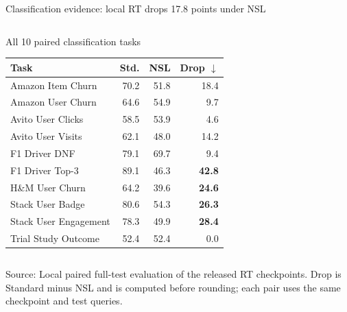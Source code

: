 \documentclass[aspectratio=169,10pt,t]{beamer}
\newcommand{\source}[1]{\vfill\par{\fontsize{6.3}{7.2}\selectfont\color{Muted}Source: #1}}
\newcommand{\bad}[1]{{\bfseries\color{Red}#1}}
\begin{document}
\begin{frame}{Classification evidence: local RT drops 17.8 points under NSL}
\begin{columns}[T,onlytextwidth]
      \vspace{0pt}
      \begin{block}{All 10 paired classification tasks}
        \fontsize{6.7}{7.7}\selectfont
        \renewcommand{\arraystretch}{1.08}
        \setlength{\tabcolsep}{2.7pt}
        \begin{tabularx}{\linewidth}{Xrrr}
          \toprule
          Task & Std. & NSL & Drop $\downarrow$ \\
          \midrule
          Amazon Item Churn & 70.2 & 51.8 & {\color{Red}18.4} \\
          Amazon User Churn & 64.6 & 54.9 & {\color{Red}9.7} \\
          Avito User Clicks & 58.5 & 53.9 & {\color{Red}4.6} \\
          Avito User Visits & 62.1 & 48.0 & {\color{Red}14.2} \\
          F1 Driver DNF & 79.1 & 69.7 & {\color{Red}9.4} \\
          F1 Driver Top-3 & 89.1 & 46.3 & \bad{42.8} \\
          H\&M User Churn & 64.2 & 39.6 & \bad{24.6} \\
          Stack User Badge & 80.6 & 54.3 & \bad{26.3} \\
          Stack User Engagement & 78.3 & 49.9 & \bad{28.4} \\
          Trial Study Outcome & 52.4 & 52.4 & 0.0 \\
          \bottomrule
        \end{tabularx}
      \end{block}
  \end{columns}
  \source{Local paired full-test evaluation of the released RT checkpoints. Drop is Standard minus NSL and is computed before rounding; each pair uses the same checkpoint and test queries.}
\end{frame}
\end{document}

